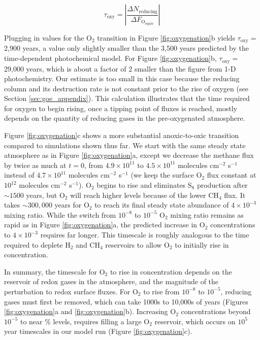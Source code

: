 \begin{equation} \label{eq:tau_oxy}
  \tau_\text{oxy} = \left| \frac{\Delta N_\text{reducing}}{\Delta F_\mathrm{O_{equiv}}} \right|
\end{equation}

Plugging in values for the O$_2$ transition in Figure \ref{fig:oxygenation}b yields $\tau_\text{oxy}=$ 2,900 years, a value only slightly smaller than the 3,500 years predicted by the time-dependent photochemical model. For Figure \ref{fig:oxygenation}b, $\tau_\text{oxy}=$ 29,000 years, which is about a factor of 2 smaller than the figure from 1-D photochemistry. Our estimate is too small in this case because the reducing column and its destruction rate is not constant prior to the rise of oxygen (see Section \ref{sec:goe_appendix}). This calculation illustrates that the time required for oxygen to begin rising, once a tipping point of fluxes is reached, mostly depends on the quantity of reducing gases in the pre-oxygenated atmosphere.

Figure \ref{fig:oxygenation}c shows a more substantial anoxic-to-oxic transition compared to simulations shown thus far. We start with the same steady state atmosphere as in Figure \ref{fig:oxygenation}a, except we decrease the methane flux by twice as much at $t = 0$, from $4.9 \times 10^{11}$ to $4.5 \times 10^{11}$ molecules cm$^{-2}$ s$^{-1}$ instead of $4.7 \times 10^{11}$ molecules cm$^{-2}$ s$^{-1}$ (we keep the surface O$_2$ flux constant at $10^{12}$ molecules cm$^{-2}$ s$^{-1}$). O$_2$ begins to rise and eliminates S$_8$ production after $\sim1500$ years, but O$_2$ will reach higher levels because of the lower CH$_4$ flux. It takes $\sim300,000$ years for O$_2$ to reach its final steady state abundance of $4 \times 10^{-3}$ mixing ratio. While the switch from $10^{-8}$ to $10^{-5}$ O$_2$ mixing ratio remains as rapid as in Figure \ref{fig:oxygenation}a, the predicted increase in O$_2$ concentrations to $4 \times 10^{-3}$ requires far longer. This timescale is roughly analogous to the time required to deplete H$_2$ and CH$_4$ reservoirs to allow O$_2$ to initially rise in concentration. 

In summary, the timescale for O$_2$ to rise in concentration depends on the reservoir of redox gases in the atmosphere, and the magnitude of the perturbation to redox surface fluxes. For O$_2$ to rise from $10^{-8}$ to $10^{-5}$, reducing gases must first be removed, which can take 1000s to 10,000s of years (Figures \ref{fig:oxygenation}a and \ref{fig:oxygenation}b). Increasing O$_2$ concentrations beyond $10^{-5}$ to near \% levels, requires filling a large O$_2$ reservoir, which occurs on $10^5$ year timescales in our model run (Figure \ref{fig:oxygenation}c).

